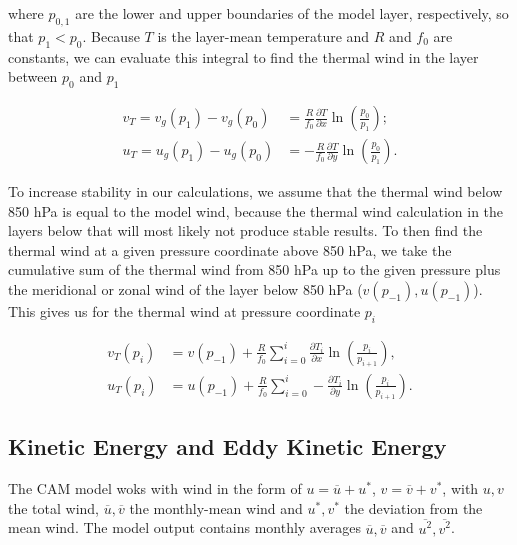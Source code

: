where $p_{0,1}$ are the lower and upper boundaries of the model layer, respectively, so that $p_1 < p_0$. Because $T$ is the layer-mean temperature and $R$ and $f_0$ are constants, we can evaluate this integral to find the thermal wind in the layer between $p_0$ and $p_1$

\begin{equation}
    \begin{split}
        v_T = v_g(p_1) - v_g(p_0) &= \frac{R}{f_0} \frac{\partial T}{\partial x} \ln\left(\frac{p_0}{p_1}\right);\\
        u_T = u_g(p_1) - u_g(p_0) &= - \frac{R}{f_0} \frac{\partial T}{\partial y} \ln\left(\frac{p_0}{p_1}\right).
    \end{split}
\end{equation}

To increase stability in our calculations, we assume that the thermal wind below 850 hPa is equal to the model wind, because the thermal wind calculation in the layers below that will most likely not produce stable results. To then find the thermal wind at a given pressure coordinate above 850 hPa, we take the cumulative sum of the thermal wind from 850 hPa up to the given pressure plus the meridional or zonal wind of the layer below 850 hPa ($v(p_{-1}),u(p_{-1})$). This gives us for the thermal wind at pressure coordinate $p_i$ 

\begin{equation}
    \begin{split}
        v_{T}(p_i) &= v(p_{-1}) + \frac{R}{f_0} \sum_{i=0}^{i} \frac{\partial T_i}{\partial x} \ln \left(\frac{p_i}{p_{i+1}}\right),\\
        u_{T}(p_i) &= u(p_{-1}) + \frac{R}{f_0} \sum_{i=0}^{i} - \frac{\partial T_i}{\partial y} \ln \left(\frac{p_i}{p_{i+1}}\right).
    \end{split}
\end{equation}


\subsection{Kinetic Energy and Eddy Kinetic Energy}
The CAM model woks with wind in the form of $u = \overline{u} + u^{\ast}$, $v = \overline{v} + v^{\ast}$, with $u,v$ the total wind, $\overline{u},\overline{v}$ the monthly-mean wind and $u^\ast,v^\ast$ the deviation from the mean wind. The model output contains monthly averages $\overline{u},\overline{v}$ and $\overline{u^2},\overline{v^2}$. %

